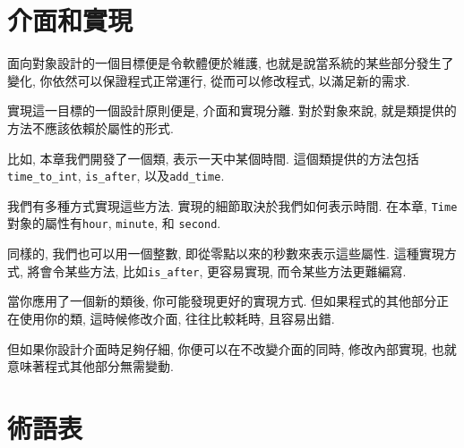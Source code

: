 \documentclass[10pt]{book}
\begin{document}
\section{介面和實現}

面向對象設計的一個目標便是令軟體便於維護, 
也就是說當系統的某些部分發生了變化, 你依然可以保證程式正常運行, 
從而可以修改程式, 以滿足新的需求. 

實現這一目標的一個設計原則便是, 介面和實現分離. 
對於對象來說, 就是類提供的方法不應該依賴於屬性的形式. 

比如, 本章我們開發了一個類, 表示一天中某個時間. 
這個類提供的方法包括
\verb"time_to_int", \verb"is_after", 以及\verb"add_time".

我們有多種方式實現這些方法. 
實現的細節取決於我們如何表示時間. 
在本章, {\tt Time}對象的屬性有{\tt hour}, {\tt minute}, 和
{\tt second}. 

同樣的, 我們也可以用一個整數, 即從零點以來的秒數來表示這些屬性. 
這種實現方式, 將會令某些方法, 比如\verb"is_after", 更容易實現, 而令某些方法更難編寫. 

當你應用了一個新的類後, 你可能發現更好的實現方式. 
但如果程式的其他部分正在使用你的類, 這時候修改介面, 
往往比較耗時, 且容易出錯. 

但如果你設計介面時足夠仔細, 你便可以在不改變介面的同時, 修改內部實現, 
也就意味著程式其他部分無需變動. 


\section{術語表}
\end{document}
